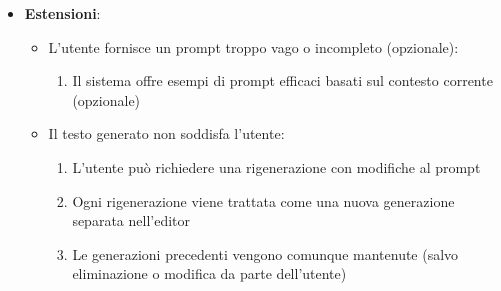 \documentclass[11pt,a4paper]{article}
\begin{document}
\begin{itemize}
\begin{itemize}
\begin{enumerate}
                    \item colore del testo generato diverso dal colore del testo dell’utente (opzionale)
                \end{enumerate}
            \item L'utente può modificare il testo generato
        \end{itemize}
    \item \textbf{Estensioni}:
        \begin{itemize}
            \item L'utente fornisce un prompt troppo vago o incompleto (opzionale):
                \begin{enumerate}
                    \item Il sistema offre esempi di prompt efficaci basati sul contesto corrente (opzionale)
                \end{enumerate}
            \item Il testo generato non soddisfa l'utente:
                \begin{enumerate}
                    \item L'utente può richiedere una rigenerazione con modifiche al prompt
                    \item Ogni rigenerazione viene trattata come una nuova generazione separata nell'editor
                    \item Le generazioni precedenti vengono comunque mantenute (salvo eliminazione o modifica da parte dell'utente)
                \end{enumerate}
        \end{itemize}
\end{itemize}
\end{document}
